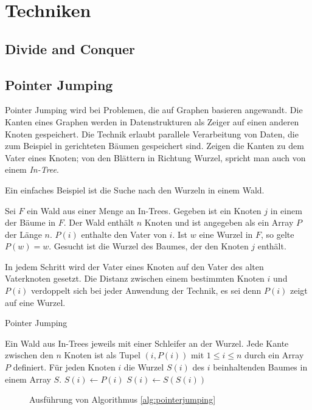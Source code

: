 \section{Techniken}

\subsection{Divide and Conquer}

\subsection{Pointer Jumping}
Pointer Jumping wird bei Problemen, die auf Graphen basieren angewandt.
Die Kanten eines Graphen werden in Datenstrukturen als Zeiger auf einen anderen
Knoten gespeichert.
Die Technik erlaubt parallele Verarbeitung von Daten, die zum Beispiel in
gerichteten Bäumen gespeichert sind.
Zeigen die Kanten zu dem Vater eines Knoten; von den Blättern in Richtung
Wurzel, spricht man auch von einem \emph{In-Tree}.

Ein einfaches Beispiel ist die Suche nach den Wurzeln in einem Wald.
\begin{problem}
    Sei $F$ ein Wald aus einer Menge an In-Trees.
    Gegeben ist ein Knoten $j$ in einem der Bäume in $F$.
    Der Wald enthält $n$ Knoten und ist angegeben als ein Array $P$ der Länge
    $n$.
    $P(i)$ enthalte den Vater von $i$.
    Ist $w$ eine Wurzel in $F$, so gelte $P(w) = w$.
    Gesucht ist die Wurzel des Baumes, der den Knoten $j$ enthält.
\end{problem}
%
In jedem Schritt wird der Vater eines Knoten auf den Vater des alten
Vaterknoten gesetzt.
Die Distanz zwischen einem bestimmten Knoten $i$ und $P(i)$ verdoppelt sich bei
jeder Anwendung der Technik, es sei denn $P(i)$ zeigt auf eine Wurzel.
%
\begin{algorithm}
    \caption{Pointer Jumping \cite[S.52]{jaja}}
    \label{alg:pointerjumping}
    \begin{algorithmic}[1]
    \Require Ein Wald aus In-Trees jeweils mit einer Schleifer an der Wurzel.
        Jede Kante zwischen den $n$ Knoten ist als Tupel $(i, P(i))$ mit
        $1 \leq i \leq n$ durch ein Array $P$ definiert.
    \Ensure Für jeden Knoten $i$ die Wurzel $S(i)$ des $i$ beinhaltenden
        Baumes in einem Array $S$.
        \State $S(i) \gets P(i)$
            \State $S(i) \gets S(S(i))$
        \EndWhile
    \EndParDo
    \end{algorithmic}
\end{algorithm}
%
\begin{figure}
    \caption{Ausführung von Algorithmus \ref{alg:pointerjumping}}
\end{figure}
%
\cite[S.52ff]{jaja}
